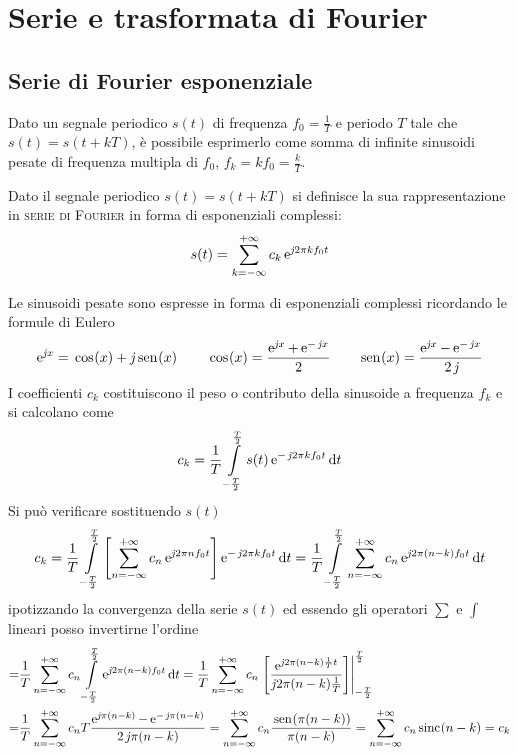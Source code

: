 \chapter{Serie e trasformata di Fourier}

\section{Serie di Fourier esponenziale}
Dato un segnale periodico $s(t)$ di frequenza $f_0=\frac{1}{T}$ e periodo $T$ tale che $s(t)=s(t+k T)$, è possibile esprimerlo come somma di infinite sinusoidi pesate di frequenza multipla di $f_0$, $f_k=k f_0=\frac{k}{T}$.

\begin{definizione}
Dato il segnale periodico $s(t)=s(t+k T)$ si definisce la sua rappresentazione in \textsc{serie di Fourier} in forma di esponenziali complessi:
\begin{equation}\label{eq:serie_fourier}\index{serie!di Fourier}
s(t)=\sum_{k=-\infty}^{+\infty} c_k \e{\imath 2\pi k f_0 t}
\end{equation}
\end{definizione}
Le sinusoidi pesate sono espresse in forma di esponenziali complessi ricordando le formule di Eulero
\begin{equation}\e{\imath x}=\cos{x}+\imath\sen{x}\qquad\cos{x}=\frac{\e{\imath x}+\e{-\imath x}}{2}\qquad\sen{x}=\frac{\e{\imath x}-\e{-\imath x}}{2\imath}\end{equation}
I coefficienti $c_k$ costituiscono il peso o contributo della sinusoide a frequenza $f_k$ e si calcolano come
\begin{equation}\label{eq:serie_fourier_coef}\index{serie!di Fourier!coefficienti}
c_k=\frac{1}{T}\intd{-\frac{T}{2}}{\frac{T}{2}}{s(t)\e{-\imath 2\pi k f_0 t}}{t}
\end{equation}
Si può verificare sostituendo $s(t)$
\[c_k=\frac{1}{T}\int\limits_{-\frac{T}{2}}^{\frac{T}{2}}{ \left[\sum_{n=-\infty}^{+\infty} c_n \operatorname{e}^{\operatorname{\mathit{j}\!} 2\pi n f_0 t}\right] \operatorname{e}^{-\operatorname{\mathit{j}\!} 2\pi k f_0 t}}{\,\mathop{}\!\mathrm{d}{t}} = \frac{1}{T}\int\limits_{-\frac{T}{2}}^{\frac{T}{2}}{ \sum_{n=-\infty}^{+\infty} c_n \operatorname{e}^{\operatorname{\mathit{j}\!} 2\pi (n-k) f_0 t} }{\,\mathop{}\!\mathrm{d}{t}} \]
ipotizzando la convergenza della serie $s(t)$ ed essendo gli operatori $\sum$ e $\int$ lineari posso invertirne l'ordine
\[\begin{split}=&\frac{1}{T}\sum_{n=-\infty}^{+\infty} c_n \intd{-\frac{T}{2}}{\frac{T}{2}}{\e{\imath 2\pi(n-k)f_0 t}}{t}
=\frac{1}{T}\sum_{n=-\infty}^{+\infty} c_n \bound{-\frac{T}{2}}{\frac{T}{2}}{\frac{\e{\imath 2\pi(n-k)\frac{1}{T}t}}{\imath 2\pi(n-k)\frac{1}{T} }}\\
=&\frac{1}{T}\sum_{n=-\infty}^{+\infty} c_n T \frac{\e{\imath \pi(n-k)}-\e{-\imath\pi(n-k)}}{2\imath\pi(n-k)}
=\sum_{n=-\infty}^{+\infty} c_n \frac{\sen{\pi(n-k)}}{\pi(n-k)}
=\sum_{n=-\infty}^{+\infty} c_n \sinc{n-k} = c_k
\end{split}\]
